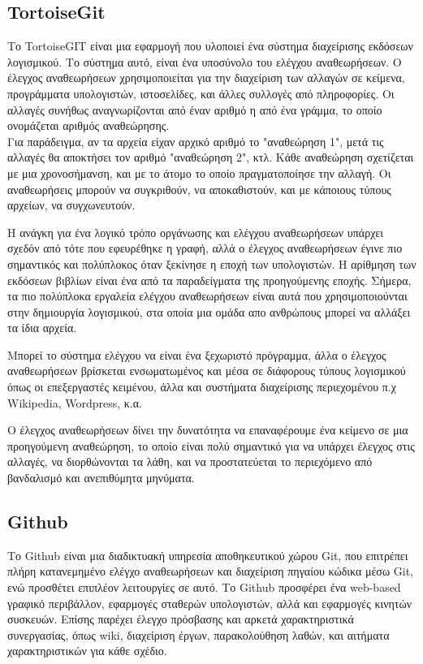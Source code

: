 \subsection{TortoiseGit}
Το TortoiseGIT είναι μια εφαρμογή που υλοποιεί ένα σύστημα διαχείρισης εκδόσεων λογισμικού. Το σύστημα αυτό, είναι ένα υποσύνολο του ελέγχου αναθεωρήσεων. Ο έλεγχος αναθεωρήσεων χρησιμοποιείται για την διαχείριση των αλλαγών σε κείμενα, προγράμματα υπολογιστών, ιστοσελίδες, και άλλες συλλογές από πληροφορίες. Οι αλλαγές συνήθως αναγνωρίζονται από έναν αριθμό η από ένα γράμμα, το οποίο ονομάζεται αριθμός αναθεώρησης.\\

Για παράδειγμα, αν τα αρχεία είχαν αρχικό αριθμό το "αναθεώρηση 1", μετά τις αλλαγές θα αποκτήσει τον αριθμό "αναθεώρηση 2", κτλ. Κάθε αναθεώρηση σχετίζεται με μια χρονοσήμανση, και με το άτομο το οποίο πραγματοποίησε την αλλαγή. Οι αναθεωρήσεις μπορούν να συγκριθούν, να αποκαθιστούν, και με κάποιους τύπους αρχείων, να συγχωνευτούν.

Η ανάγκη για ένα λογικό τρόπο οργάνωσης και ελέγχου αναθεωρήσεων υπάρχει σχεδόν από τότε που εφευρέθηκε η γραφή, αλλά ο έλεγχος αναθεωρήσεων έγινε πιο σημαντικός και πολύπλοκος όταν ξεκίνησε η εποχή των υπολογιστών. Η αρίθμηση των εκδόσεων βιβλίων είναι ένα από τα παραδείγματα της προηγούμενης εποχής. Σήμερα, τα πιο πολύπλοκα εργαλεία ελέγχου αναθεωρήσεων είναι αυτά που χρησιμοποιούνται στην δημιουργία λογισμικού, στα οποία μια ομάδα απο ανθρώπους μπορεί να αλλάξει τα ίδια αρχεία.

Μπορεί το σύστημα ελέγχου να είναι ένα ξεχωριστό πρόγραμμα, άλλα ο έλεγχος αναθεωρήσεων βρίσκεται ενσωματωμένος και μέσα σε διάφορους τύπους λογισμικού όπως οι επεξεργαστές κειμένου, άλλα και συστήματα διαχείρισης περιεχομένου
π.χ Wikipedia, Wordpress, κ.α.

Ο έλεγχος αναθεωρήσεων δίνει την δυνατότητα να επαναφέρουμε ένα κείμενο σε μια προηγούμενη αναθεώρηση, το οποίο είναι πολύ σημαντικό για να υπάρχει έλεγχος στις αλλαγές, να διορθώνονται τα λάθη, και να προστατεύεται το περιεχόμενο από βανδαλισμό και ανεπιθύμητα μηνύματα.
\subsection{Github}
Το Github είναι μια διαδικτυακή υπηρεσία αποθηκευτικού χώρου Git, που επιτρέπει πλήρη κατανεμημένο ελέγχο αναθεωρήσεων και διαχείριση πηγαίου κώδικα μέσω Git, ενώ προσθέτει επιπλέον λειτουργίες σε αυτό. Το Github προσφέρει ένα web-based γραφικό περιβάλλον, εφαρμογές σταθερών υπολογιστών, αλλά και εφαρμογές κινητών συσκευών. Επίσης παρέχει έλεγχο πρόσβασης και αρκετά χαρακτηριστικά συνεργασίας, όπως wiki, διαχείριση έργων, παρακολούθηση λαθών, και αιτήματα χαρακτηριστικών για κάθε σχέδιο.

